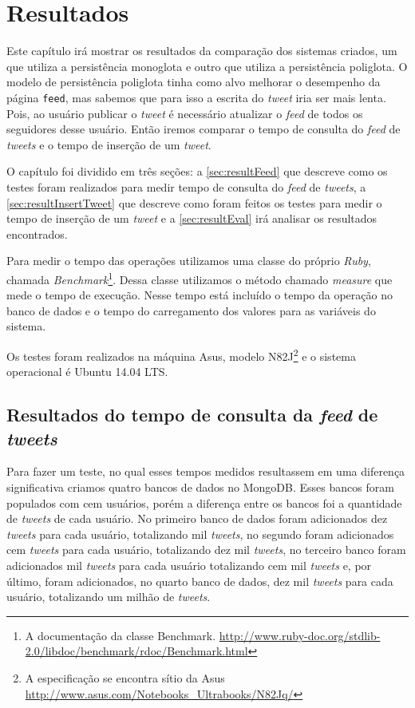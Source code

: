 \chapter{Resultados}
\label{chap:resultados}
Este capítulo irá mostrar os resultados da comparação dos sistemas criados, um que utiliza a persistência monoglota e outro que utiliza a persistência poliglota. O modelo de persistência poliglota tinha como alvo melhorar o desempenho da página \verb|feed|, mas sabemos que para isso a escrita do \textit{tweet} iria ser mais lenta. Pois, ao usuário publicar o \textit{tweet} é necessário atualizar o \textit{feed} de todos os seguidores desse usuário. Então iremos comparar o tempo de consulta do \textit{feed} de \textit{tweets} e o tempo de inserção de um \textit{tweet}.

O capítulo foi dividido em três seções: a \autoref{sec:resultFeed} que descreve como os testes foram realizados para medir tempo de consulta do \textit{feed} de \textit{tweets}, a \autoref{sec:resultInsertTweet} que descreve como foram feitos os testes para medir o tempo de inserção de um \textit{tweet} e a \autoref{sec:resultEval} irá analisar os resultados encontrados.

Para medir o tempo das operações utilizamos uma classe do próprio \textit{Ruby}, chamada \textit{Benchmark}\footnote{A documentação da classe Benchmark. \url{http://www.ruby-doc.org/stdlib-2.0/libdoc/benchmark/rdoc/Benchmark.html}}. Dessa classe utilizamos o método chamado \textit{measure} que mede o tempo de execução. Nesse tempo está incluído o tempo da operação no banco de dados e o tempo do carregamento dos valores para as variáveis do sistema.

Os testes foram realizados na máquina Asus, modelo N82J\footnote{A especificação se encontra sítio da Asus \url{http://www.asus.com/Notebooks_Ultrabooks/N82Jq/}} e o sistema operacional é Ubuntu 14.04 LTS.


\section{Resultados do tempo de consulta da \textit{feed} de \textit{tweets}}
\label{sec:resultFeed}

Para fazer um teste, no qual esses tempos medidos resultassem em uma diferença significativa criamos quatro bancos de dados no MongoDB. Esses bancos foram populados com cem usuários, porém a diferença entre os bancos foi a quantidade de \textit{tweets} de cada usuário. No primeiro banco de dados foram adicionados dez \textit{tweets} para cada usuário, totalizando mil \textit{tweets}, no segundo foram adicionados cem \textit{tweets} para cada usuário, totalizando dez mil \textit{tweets}, no terceiro banco foram adicionados mil \textit{tweets} para cada usuário totalizando cem mil \textit{tweets} e, por último, foram adicionados, no quarto banco de dados, dez mil \textit{tweets} para cada usuário, totalizando um milhão de \textit{tweets}.

